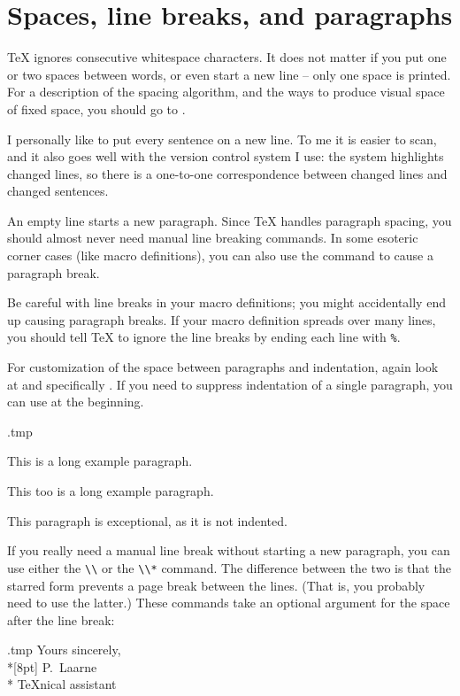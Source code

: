 %
%
%
\section{Spaces, line breaks, and paragraphs}

\TeX{} ignores consecutive whitespace characters.
It does not matter if you put one or two spaces between words,
or even start a new line -- only one space is printed.
For a description of the spacing algorithm, and the ways to produce visual space of fixed space,
you should go to .

\begin{practices}
I personally like to put every sentence on a new line.
To me it is easier to scan,
and it also goes well with the version control system I use:
the system highlights changed lines,
so there is a one-to-one correspondence between changed lines and changed sentences.
\end{practices}

An empty line starts a new paragraph.
Since \TeX{} handles paragraph spacing, you should almost never need manual line breaking commands.
In some esoteric corner cases (like macro definitions),
you can also use the  command to cause a paragraph break.

\begin{gotcha}
Be careful with line breaks in your macro definitions;
you might accidentally end up causing paragraph breaks.
If your macro definition spreads over many lines,
you should tell \TeX{} to ignore the line breaks by ending each line with \verb|%|.
\end{gotcha}

For customization of the space between paragraphs and indentation,
again look at  and specifically .
If you need to suppress indentation of a single paragraph,
you can use  at the beginning.
%
\begin{VerbatimOut}{\jobname.tmp}
\setlength\parindent{2em}
\setlength\parskip{0pt}

This is a long example paragraph.

This too is a long example paragraph.

\noindent
This paragraph is exceptional,
as it is not indented.
\end{VerbatimOut}
\ShowExample


If you really need a manual line break without starting a new paragraph,
you can use either the \verb|\\| or the \verb|\\*| command.
The difference between the two is that the starred form prevents a page break between the lines.
(That is, you probably need to use the latter.)
These commands take an optional argument for the space after the line break:
%
\begin{VerbatimOut}{\jobname.tmp}
Yours sincerely,\\*[8pt]
P.~Laarne\\*
\TeX nical assistant
\end{VerbatimOut}
\ShowExample



